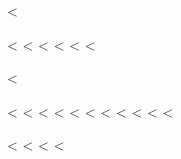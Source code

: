 < \documentclass[pdftex,11pt,a4paper,twoside]{book}
\begin{document}
< \frontmatter
< 
< 
< 
< \tableofcontents
< \listoffigures
< \listoftables
< \enlargethispage{\baselineskip}
< \mainmatter
< 
< 
<  
< 
< 
< 
< \backmatter
< 
<  
< \printindex
< \label{verylast}
< \mbox{}
< 
\end{document}
